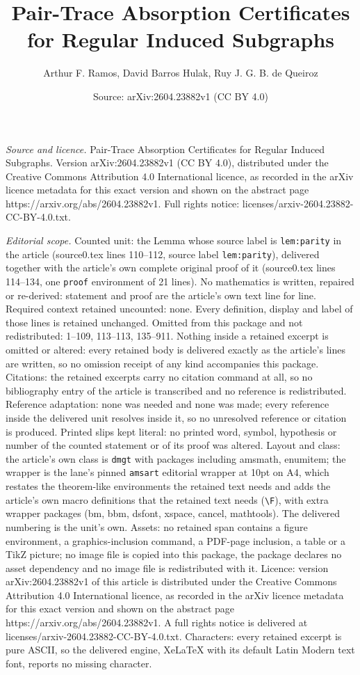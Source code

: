 \documentclass[10pt,a4paper]{amsart}
\title[Pair-Trace Absorption Certificates for Regular Induced Subgr]{Pair-Trace Absorption Certificates for Regular Induced Subgraphs}
\author{Arthur F. Ramos, David Barros Hulak, Ruy J. G. B. de Queiroz}
\date{Source: arXiv:2604.23882v1 (CC BY 4.0)}
\begin{document}
\maketitle

\noindent\emph{Source and licence.} Pair-Trace Absorption Certificates for Regular Induced Subgraphs. Version arXiv:2604.23882v1 (CC BY 4.0), distributed under the Creative Commons Attribution 4.0 International licence, as recorded in the arXiv licence metadata for this exact version and shown on the abstract page https://arxiv.org/abs/2604.23882v1. Full rights notice: licenses/arxiv-2604.23882-CC-BY-4.0.txt.\par\smallskip

\noindent\textit{Editorial scope.} Counted unit: the Lemma whose source label is \texttt{lem:parity} in the article (source0.tex lines 110--112, source label \texttt{lem:parity}), delivered together with the article's own complete original proof of it (source0.tex lines 114--134, one \texttt{proof} environment of 21 lines). No mathematics is written, repaired or re-derived: statement and proof are the article's own text line for line. Required context retained uncounted: none. Every definition, display and label of those lines is retained unchanged. Omitted from this package and not redistributed: 1--109, 113--113, 135--911. Nothing inside a retained excerpt is omitted or altered: every retained body is delivered exactly as the article's lines are written, so no omission receipt of any kind accompanies this package. Citations: the retained excerpts carry no citation command at all, so no bibliography entry of the article is transcribed and no reference is redistributed. Reference adaptation: none was needed and none was made; every reference inside the delivered unit resolves inside it, so no unresolved reference or citation is produced. Printed slips kept literal: no printed word, symbol, hypothesis or number of the counted statement or of its proof was altered. Layout and class: the article's own class is \texttt{dmgt} with packages including amsmath, enumitem; the wrapper is the lane's pinned \texttt{amsart} editorial wrapper at 10pt on A4, which restates the theorem-like environments the retained text needs and adds the article's own macro definitions that the retained text needs (\texttt{\textbackslash F}), with extra wrapper packages (bm, bbm, dsfont, xspace, cancel, mathtools). The delivered numbering is the unit's own. Assets: no retained span contains a figure environment, a graphics-inclusion command, a PDF-page inclusion, a table or a TikZ picture; no image file is copied into this package, the package declares no asset dependency and no image file is redistributed with it. Licence: version arXiv:2604.23882v1 of this article is distributed under the Creative Commons Attribution 4.0 International licence, as recorded in the arXiv licence metadata for this exact version and shown on the abstract page https://arxiv.org/abs/2604.23882v1. A full rights notice is delivered at licenses/arxiv-2604.23882-CC-BY-4.0.txt. Characters: every retained excerpt is pure ASCII, so the delivered engine, XeLaTeX with its default Latin Modern text font, reports no missing character.
\end{document}
